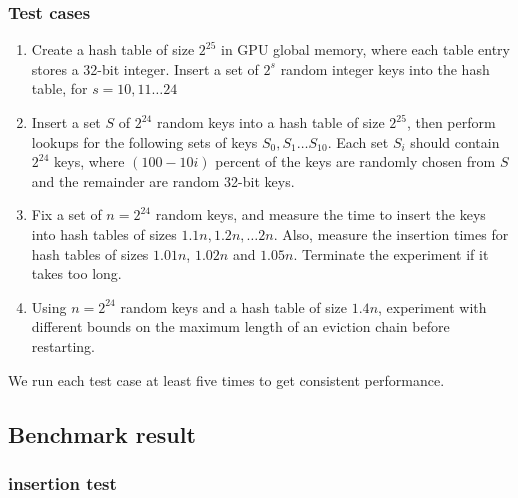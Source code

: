 \documentclass{article}
\begin{document}
\subsubsection*{Test cases}

\begin{enumerate}
	\item Create a hash table of size $2^{25}$ in GPU global memory, where each table entry stores a
	      32-bit integer. Insert a set of $2^s$ random integer keys into the hash table, for $s=10,11\ldots 24$
	\item Insert a set $S$ of $2^{24}$ random keys into a hash table of size $2^{25}$, then perform lookups for the following sets of keys
	      $S_0,S_1\ldots S_{10}$. Each set $S_i$ should contain $2^{24}$ keys, where $(100-10i)$ percent of the keys are randomly chosen from $S$ and the remainder are random 32-bit keys.
	\item Fix a set of $n=2^{24}$ random keys, and measure the time to insert the keys into hash tables of sizes $1.1n, 1.2n,\ldots 2n$. Also, measure the insertion times for hash tables of sizes $1.01n$, $1.02n$ and $1.05n$. Terminate the experiment if it takes too long.
	\item Using $n=2^{24}$ random keys and a hash table of size $1.4n$, experiment with different bounds on the maximum length of an eviction chain before restarting.
\end{enumerate}

We run each test case at least five times to get consistent performance.

\subsection{Benchmark result}

\subsubsection*{insertion test}
\end{document}
